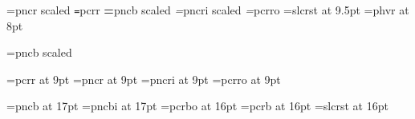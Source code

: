 \def\leadline{\ \leaders\hrule height 2.5pt depth -2pt\hfil\ }
\def\HEADINGSsingle{
\global\pageno=1
\evenfootline={\line{\let\,=\thinspace\ftfnt c\,y\,g\,n\,u\,s\quad s\,u\,p\,p\,o\,r\,t\leadline\manvers}}
\oddfootline={\line {\let\,=\thinspace\ftfnt c\,y\,g\,n\,u\,s\quad s\,u\,p\,p\,o\,r\,t\leadline\manvers}}
\global\evenheadline={\line{\ftfnt\thischapter\leadline
		\ifdraft DRAFT\leadline\fi
		\bf\folio}}
\global\oddheadline={\line{\ftfnt\thischapter\leadline
		\ifdraft DRAFT\leadline\fi
		\bf\folio}}
}
%
\def\manvers{}%
\def\HEADINGSdouble{
\pageno=1
\evenfootline={\vbox{\line{{\bf\folio}\ftfnt\leadline\ifdraft DRAFT\quad\fi\ftfnt\manvers\qquad\today}}}
\oddfootline={\vbox{\line{{\let\,=\thinspace\ftfnt c\,y\,g\,n\,u\,s\quad s\,u\,p\,p\,o\,r\,t}\leadline{\bf\folio}}}}
\evenheadline={\vbox{\line{\ftfnt\thistitle\leadline\ifdraft DRAFT\fi}}}
\oddheadline={\vbox{\line{\rm\leadline\thischapter}}}
}

\def\finalout{\overfullrule=0pt
	\global\draftfalse
			}

\font\textrm=pncr scaled \magstephalf
\font\texttt=pcrr
\font\textbf=pncb scaled \magstephalf 
\font\textit=pncri scaled \magstephalf
\font\textsl=pcrro
\font\textsf=slcrst at 9.5pt
\font\ftfnt=phvr at 8pt %

\font{}=pncb scaled  %

\font\ninett=pcrr at 9pt
\let\indtt=\ninett
\font\indrm=pncr at 9pt
\font\indit=pncri at 9pt
\font\indsl=pcrro at 9pt
\let\indsf=\indrm
\let\indbf=\indrm
\let\indsc=\indrm

\font\chaprm=pncb at 17pt
\font\chapit=pncbi at 17pt
\font\chapsl=pcrbo at 16pt
\font\chaptt=pcrb at 16pt
\font\chapsf=slcrst at 16pt
\let\chapbf=\chaprm

